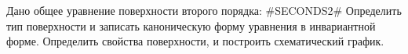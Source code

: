 Дано общее уравнение поверхности второго порядка:
#SECONDS2#
Определить тип поверхности и записать каноническую форму уравнения в инвариантной форме. Определить свойства поверхности, и построить схематический график. 